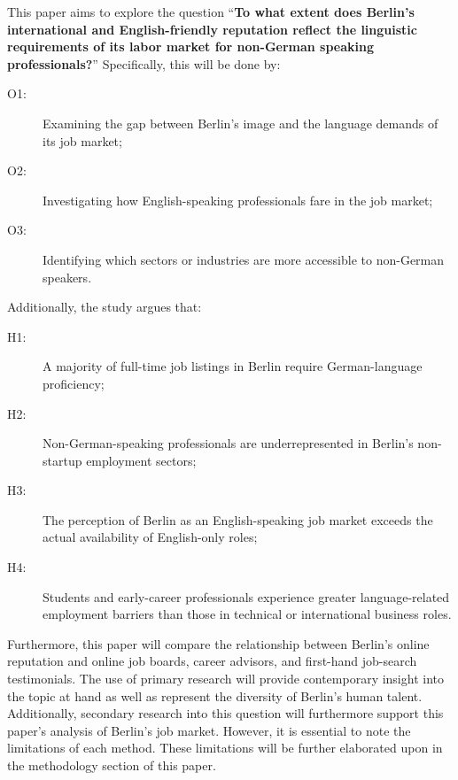 This paper aims to explore the question “\textbf{To what extent does Berlin’s international and English-friendly reputation reflect the linguistic requirements of its labor market for non-German speaking professionals?}” Specifically, this will be done by:
\begin{description}
\item[O1:] Examining the gap between Berlin’s image and the language demands of its job market;
\item[O2:] Investigating how English-speaking professionals fare in the job market;
\item[O3:] Identifying which sectors or industries are more accessible to non-German speakers.\end{description}
Additionally, the study argues that: \begin{description}
	\item[H1:] A majority of full-time job listings in Berlin require German-language proficiency;
	\item[H2:] Non-German-speaking professionals are underrepresented in Berlin’s non-startup employment sectors;
	\item[H3:] The perception of Berlin as an English-speaking job market exceeds the actual availability of English-only roles;
	\item[H4:] Students and early-career professionals experience greater language-related employment barriers than those in technical or international business roles.
\end{description} 

Furthermore, this paper will compare the relationship between Berlin’s online reputation and online job boards, career advisors, and first-hand job-search testimonials. The use of primary research will provide contemporary insight into the topic at hand as well as represent the diversity of Berlin’s human talent. Additionally, secondary research into this question will furthermore support this paper’s analysis of Berlin’s job market. However, it is essential to note the limitations of each method. These limitations will be further elaborated upon in the methodology section of this paper.

\titlespacing*{\chapter}{0pt}{12pt}{0pt}